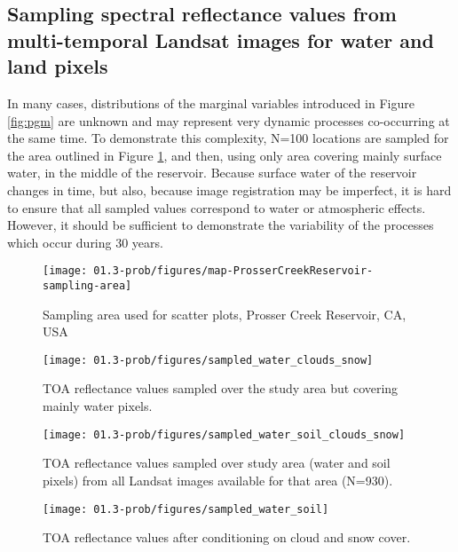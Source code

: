 \subsection{Sampling spectral reflectance values from multi-temporal Landsat images for water and land pixels}

In many cases, distributions of the marginal variables introduced in Figure \ref{fig:pgm} are unknown and may represent very dynamic processes co-occurring at the same time. To demonstrate this complexity, N=100 locations are sampled for the area outlined in Figure \ref{fig:study-area-PC}, and then, using only area covering mainly surface water, in the middle of the reservoir. Because surface water of the reservoir changes in time, but also, because image registration may be imperfect, it is hard to ensure that all sampled values correspond to water or atmospheric effects. However, it should be sufficient to demonstrate the variability of the processes which occur during 30 years.

\begin{figure}[H]
	\centering
	\texttt{[image: 01.3-prob/figures/map-ProsserCreekReservoir-sampling-area]}
	\caption{Sampling area used for scatter plots, Prosser Creek Reservoir, CA, USA}
	\label{fig:study-area-PC}
\end{figure}

\begin{figure}[H]
	\texttt{[image: 01.3-prob/figures/sampled\_water\_clouds\_snow]}
	\caption{TOA reflectance values sampled over the study area but covering mainly water pixels.}
	\label{fig:prob-sampled-water-cloud-snow}
\end{figure}

\begin{figure}[H]
	\texttt{[image: 01.3-prob/figures/sampled\_water\_soil\_clouds\_snow]}
	\caption{TOA reflectance values sampled over study area (water and soil pixels) from all Landsat images available for that area (N=930).}
	\label{fig:prob-sampled-water-soil-cloud-snow}
\end{figure}

\begin{figure}[H]
	\texttt{[image: 01.3-prob/figures/sampled\_water\_soil]}
	\caption{TOA reflectance values after conditioning on cloud and snow cover.}
	\label{fig:prob-sampled-water-soil}
\end{figure}



